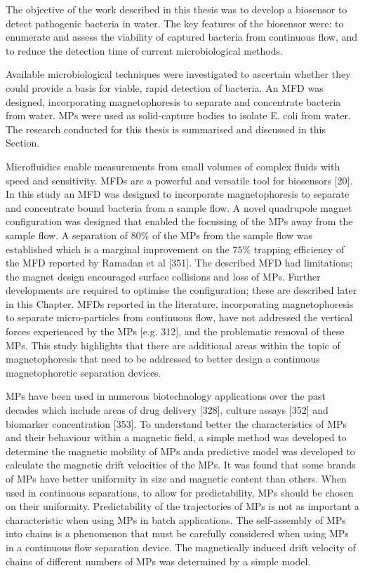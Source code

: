 The objective of the work described in this thesis was to develop a biosensor to detect pathogenic bacteria in water. The key features of the biosensor were: to enumerate and assess the viability of captured bacteria from continuous flow, and to reduce the detection time of current microbiological methods. 

Available microbiological techniques were investigated to ascertain whether they could provide a basis for viable, rapid detection of bacteria. An MFD was designed, incorporating magnetophoresis to separate and concentrate bacteria from water. MPs were used as solid-capture bodies to isolate E. coli from water. The research conducted for this thesis is summarised and discussed in this Section.

Microfluidics enable measurements from small volumes of complex fluids with speed and sensitivity. MFDs are a powerful and versatile tool for biosensors [20]. In this study an MFD was designed to incorporate magnetophoresis to separate and concentrate bound bacteria from a sample flow. A novel quadrupole magnet configuration was designed that enabled the focussing of the MPs away from the sample flow. A separation of $80\%$ of the MPs from the sample flow was established which is a marginal improvement on the $75\%$ trapping efficiency of the MFD reported by Ramadan et al [351].
The described MFD had limitations; the magnet design encouraged surface collisions and loss of MPs. Further developments are required to optimise the configuration; these are described later in this Chapter. MFDs reported in the literature, incorporating magnetophoresis to separate micro-particles from continuous flow, have not addressed the vertical forces experienced by the MPs [e.g. 312], and the problematic removal of these MPs. This study highlights that there are additional areas within the topic of magnetophoresis that need to be addressed to better design a continuous magnetophoretic separation devices. 

MPs have been used in numerous biotechnology applications over the past decades which include areas of drug delivery [328], culture assays [352] and biomarker concentration [353]. To understand better the characteristics of MPs and their behaviour within a magnetic field, a simple method was developed to determine the magnetic mobility of MPs anda predictive model was developed to calculate the magnetic drift velocities of the MPs. It was found that some brands of MPs have better uniformity in size and magnetic content than others. When used in continuous separations, to allow for predictability, MPs should be chosen on their uniformity. Predictability of the trajectories of MPs is not as important a characteristic when using MPs in batch applications. The self-assembly of MPs into chains is a phenomenon that must be carefully considered when using MPs in a continuous flow separation device. The magnetically induced drift velocity of chains of different numbers of MPs was determined by a simple model.





